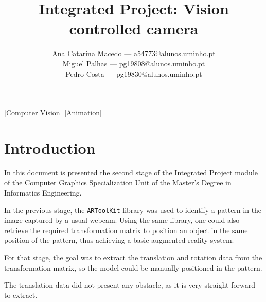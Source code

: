 \documentclass{acmtog}
\begin{document}

\title{Integrated Project: Vision controlled camera} %

\author{
Ana Catarina Macedo --- {\ttfamily a54773@alunos.uminho.pt}\\
Miguel Palhas --- {\ttfamily pg19808@alunos.uminho.pt}\\
Pedro Costa --- {\ttfamily pg19830@alunos.uminho.pt}\\
}

[Computer Vision]
[Animation]



\maketitle

\begin{abstract}
\end{abstract}


\section{Introduction}
In this document is presented the second stage of the Integrated Project module of the Computer Graphics Specialization Unit of the Master's Degree in Informatics Engineering.

In the previous stage, the \texttt{ARToolKit} library was used to identify a pattern in the image captured by a usual webcam. Using the same library, one could also retrieve the required transformation matrix to position an object in the same position of the pattern, thus achieving a basic augmented reality system.

For that stage, the goal was to extract the translation and rotation data from the transformation matrix, so the model could be manually positioned in the pattern.

The translation data did not present any obstacle, as it is very straight forward to extract.
\end{document}
